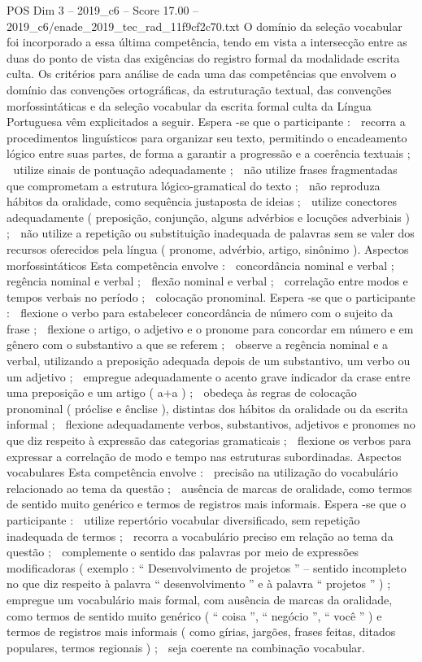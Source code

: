 \begin{textsample}{POS Dim 3 – 2019\_c6 – Score 17.00 – 2019\_c6/enade\_2019\_tec\_rad\_11f9cf2c70.txt}
O domínio da seleção vocabular foi incorporado a essa última competência, tendo em vista a intersecção entre as duas do ponto de vista das exigências do registro formal da modalidade escrita culta.
Os critérios para análise de cada uma das competências que envolvem o domínio das convenções ortográficas, da estruturação textual, das convenções morfossintáticas e da seleção vocabular da escrita formal culta da Língua Portuguesa vêm explicitados a seguir.
Espera -se que o participante :  recorra a procedimentos linguísticos para organizar seu texto, permitindo o encadeamento lógico entre suas partes, de forma a garantir a progressão e a coerência textuais ;  utilize sinais de pontuação adequadamente ;  não utilize frases fragmentadas que comprometam a estrutura lógico-gramatical do texto ;  não reproduza hábitos da oralidade, como sequência justaposta de ideias ;  utilize conectores adequadamente ( preposição, conjunção, alguns advérbios e locuções adverbiais ) ;  não utilize a repetição ou substituição inadequada de palavras sem se valer dos recursos oferecidos pela língua ( pronome, advérbio, artigo, sinônimo ).
Aspectos morfossintáticos Esta competência envolve :  concordância nominal e verbal ;  regência nominal e verbal ;  flexão nominal e verbal ;  correlação entre modos e tempos verbais no período ;  colocação pronominal.
Espera -se que o participante :  flexione o verbo para estabelecer concordância de número com o sujeito da frase ;  flexione o artigo, o adjetivo e o pronome para concordar em número e em gênero com o substantivo a que se referem ;  observe a regência nominal e a verbal, utilizando a preposição adequada depois de um substantivo, um verbo ou um adjetivo ;  empregue adequadamente o acento grave indicador da crase entre uma preposição e um artigo ( a+a ) ;  obedeça às regras de colocação pronominal ( próclise e ênclise ), distintas dos hábitos da oralidade ou da escrita informal ;  flexione adequadamente verbos, substantivos, adjetivos e pronomes no que diz respeito à expressão das categorias gramaticais ;  flexione os verbos para expressar a correlação de modo e tempo nas estruturas subordinadas.
Aspectos vocabulares Esta competência envolve :  precisão na utilização do vocabulário relacionado ao tema da questão ;  ausência de marcas de oralidade, como termos de sentido muito genérico e termos de registros mais informais.
Espera -se que o participante :  utilize repertório vocabular diversificado, sem repetição inadequada de termos ;  recorra a vocabulário preciso em relação ao tema da questão ;  complemente o sentido das palavras por meio de expressões modificadoras ( exemplo : “ Desenvolvimento de projetos ” – sentido incompleto no que diz respeito à palavra “ desenvolvimento ” e à palavra “ projetos ” ) ;  empregue um vocabulário mais formal, com ausência de marcas da oralidade, como termos de sentido muito genérico ( “ coisa ”, “ negócio ”, “ você ” ) e termos de registros mais informais ( como gírias, jargões, frases feitas, ditados populares, termos regionais ) ;  seja coerente na combinação vocabular.

\end{textsample}
